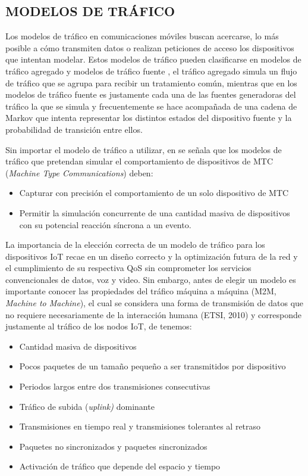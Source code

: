 \subsection{MODELOS DE TRÁFICO}

Los modelos de tráfico en comunicaciones móviles buscan acercarse, lo más posible a cómo transmiten datos o realizan peticiones de acceso los dispositivos que intentan modelar. Estos modelos de tráfico pueden clasificarse en modelos de tráfico\textbf{ }agregado y modelos de tráfico fuente \parencite{Laner2013}, el tráfico agregado simula un flujo de tráfico que se agrupa para recibir un tratamiento común, mientras que en los modelos de tráfico fuente es justamente cada una de las fuentes generadoras del tráfico la que se simula y frecuentemente se hace acompañada de una cadena de Markov que intenta representar los distintos estados del dispositivo fuente y la probabilidad de transición entre ellos.\newline

Sin importar el modelo de tráfico a utilizar, en \parencite{Laner2013} se señala que los modelos de tráfico que pretendan simular el comportamiento de dispositivos de MTC (\textit{Machine Type Communications}) deben:

\begin{itemize}
\item  Capturar con precisión el comportamiento de un solo dispositivo de MTC 
\item  Permitir la simulación concurrente de una cantidad masiva de dispositivos con su potencial reacción síncrona a un evento.
\end{itemize}

La importancia de la elección correcta de un modelo de tráfico para los dispositivos IoT recae en un diseño correcto y la optimización futura de la red y el cumplimiento de su respectiva QoS sin comprometer los servicios convencionales de datos, voz y video. Sin embargo, antes de elegir un modelo es importante conocer las propiedades del tráfico máquina a máquina (M2M, \textit{Machine to Machine}), el cual se considera una forma de transmisión de datos que no requiere necesariamente de la interacción humana (ETSI, 2010) y corresponde justamente al tráfico de los nodos IoT, de \parencite{Laner2013} tenemos:

\begin{itemize}
\item  Cantidad masiva de dispositivos
\item  Pocos paquetes de un tamaño pequeño a ser transmitidos por dispositivo
\item  Periodos largos entre dos transmisiones consecutivas
\item  Tráfico de subida (\textit{uplink)} dominante
\item  Transmisiones en tiempo real y transmisiones tolerantes al retraso
\item  Paquetes no sincronizados y paquetes sincronizados
\item  Activación de tráfico que depende del espacio y tiempo
\end{itemize}

